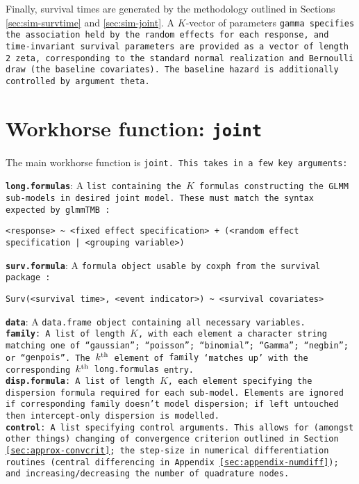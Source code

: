Finally, survival times are generated by the methodology outlined in Sections \ref{sec:sim-survtime} and \ref{sec:sim-joint}. A $K$-vector of parameters \tt{gamma} specifies the association held by the random effects for each response, and time-invariant survival parameters are provided as a vector of length 2 \tt{zeta}, corresponding to the standard normal realization and Bernoulli draw (\ie the baseline covariates). The baseline hazard is additionally controlled by argument \tt{theta}. 


\section{Workhorse function: \tt{joint}}\label{sec:appendix-gmvjoint-joint}
The main workhorse function is \tt{joint}. This takes in a few key arguments:

\textbf{\tt{long.formulas}}: A \tt{list} containing the $K$ \tt{formula}s constructing the GLMM sub-models in desired joint model. These must match the syntax expected by \tt{glmmTMB} \citep{R-glmmTMB}:
\begin{lstlisting}
<response> ~ <fixed effect specification> + (<random effect specification | <grouping variable>)
\end{lstlisting}
\textbf{\tt{surv.formula}}: A \tt{formula} object usable by \tt{coxph} from the \tt{survival} package \citep{R-survival}:
\begin{lstlisting}
Surv(<survival time>, <event indicator>) ~ <survival covariates>
\end{lstlisting}
\textbf{\tt{data}}: A \tt{data.frame} object containing all necessary variables.\\
\textbf{\tt{family}}: A \tt{list} of length $K$, with each element a character string matching one of ``\tt{gaussian}''; ``\tt{poisson}''; ``\tt{binomial}''; ``\tt{Gamma}''; ``\tt{negbin}''; or ``\tt{genpois}''. The $k^{\text{th}}$ element of \tt{family} `matches up' with the corresponding $k^{\text{th}}$ \tt{long.formulas} entry.\\
\textbf{\tt{disp.formula}}: A \tt{list} of length $K$, each element specifying the dispersion \tt{formula} required for each sub-model. Elements are ignored if corresponding family doesn't model dispersion; if left untouched then intercept-only dispersion is modelled.\\
\textbf{\tt{control}}: A \tt{list} specifying control arguments. This allows for (amongst other things) changing of convergence criterion outlined in Section \ref{sec:approx-convcrit}; the step-size in numerical differentiation routines (\eg central differencing in Appendix \ref{sec:appendix-numdiff}); and increasing/decreasing the number of quadrature nodes.

